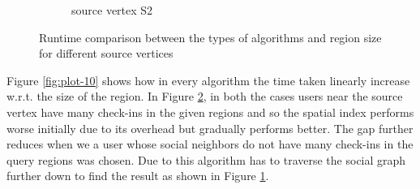 \begin{figure}[t]
\begin{subfigure}[t]{0.23\textwidth}
		\caption{source vertex S2}
		\label{fig:plot-11}
	\end{subfigure}
	\caption{Runtime comparison between the types of {\rrp} algorithms and region size for different source vertices}
	\label{fig:plot1011}
\end{figure}

Figure \ref{fig:plot-10} shows how in every algorithm the time taken linearly increase w.r.t. the size of the region. In Figure \ref{fig:plot1011}, in both the cases users near the source vertex have many check-ins in the given regions and so the spatial index performs worse initially due to its overhead but gradually performs better. The gap further reduces when we a user whose social neighbors do not have many check-ins in the query regions was chosen. Due to this algorithm has to traverse the social graph further down to find the result as shown in Figure \ref{fig:plot-11}.
